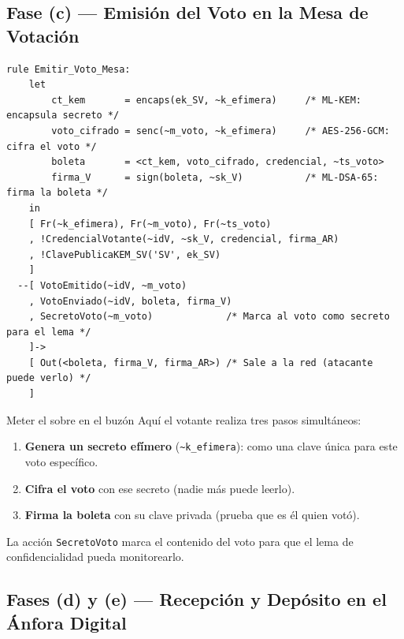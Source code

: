 \documentclass[12pt, a4paper]{article}
\begin{document}
\subsection{Fase (c) — Emisión del Voto en la Mesa de Votación}

\begin{lstlisting}[caption={Regla: El votante cifra y firma su sufragio.}]
rule Emitir_Voto_Mesa:
    let
        ct_kem       = encaps(ek_SV, ~k_efimera)     /* ML-KEM: encapsula secreto */
        voto_cifrado = senc(~m_voto, ~k_efimera)     /* AES-256-GCM: cifra el voto */
        boleta       = <ct_kem, voto_cifrado, credencial, ~ts_voto>
        firma_V      = sign(boleta, ~sk_V)           /* ML-DSA-65: firma la boleta */
    in
    [ Fr(~k_efimera), Fr(~m_voto), Fr(~ts_voto)
    , !CredencialVotante(~idV, ~sk_V, credencial, firma_AR)
    , !ClavePublicaKEM_SV('SV', ek_SV)
    ]
  --[ VotoEmitido(~idV, ~m_voto)
    , VotoEnviado(~idV, boleta, firma_V)
    , SecretoVoto(~m_voto)             /* Marca al voto como secreto para el lema */
    ]->
    [ Out(<boleta, firma_V, firma_AR>) /* Sale a la red (atacante puede verlo) */
    ]
\end{lstlisting}

\begin{cajaAnalogía}{Meter el sobre en el buzón}
Aquí el votante realiza tres pasos simultáneos:
\begin{enumerate}[itemsep=2pt]
  \item \textbf{Genera un secreto efímero} (\texttt{{\textasciitilde}k\_efimera}):
        como una clave única para este voto específico.
  \item \textbf{Cifra el voto} con ese secreto (nadie más puede leerlo).
  \item \textbf{Firma la boleta} con su clave privada (prueba que es él quien votó).
\end{enumerate}
La acción \texttt{SecretoVoto} marca el contenido del voto para que el
lema de confidencialidad pueda monitorearlo.
\end{cajaAnalogía}

\subsection{Fases (d) y (e) — Recepción y Depósito en el Ánfora Digital}
\end{document}
